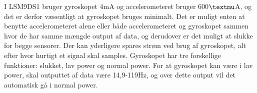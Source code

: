I LSM9DS1 bruger gyroskopet 4mA og accelerometeret bruger 600$\textmu$A, og det er derfor væsentligt at gyroskopet bruges minimalt. Det er muligt enten at benytte accelerometeret alene eller både accelerometeret og gyroskopet sammen hvor de har samme mængde output af data, og derudover er det muligt at slukke for begge sensorer. Der kan yderligere spares strøm ved brug af gyroskopet, alt efter hvor hurtigt et signal skal samples. Gyroskopet har tre forskellige funktioner: slukket, lav power og normal power. For at gyroskopet kan være i lav power, skal outputtet af data være 14,9-119Hz, og over dette output vil det automatisk gå i normal power. 
